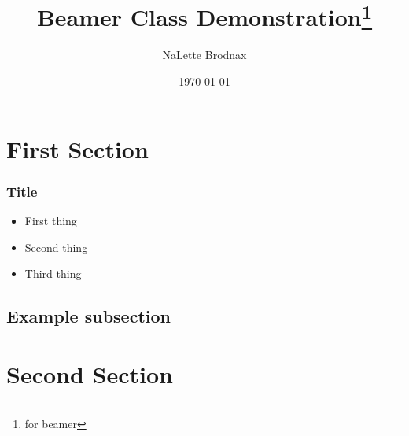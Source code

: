 \documentclass[14pt]{beamer}
\title[Beamer Demo]{Beamer Class Demonstration\thanks{for beamer}}
\author{NaLette Brodnax}
\date{\today}
\institute{McCourt School of Public Policy}
\begin{document}
\frame[plain]{\titlepage}


\section[Features]{First Section}

\begin{frame}
	\frametitle{Title}
	\begin{itemize}
		\item First thing
		\item Second thing
		\item Third thing
	\end{itemize}
\end{frame}

\subsection{Example subsection}

\section{Second Section}
\end{document}
